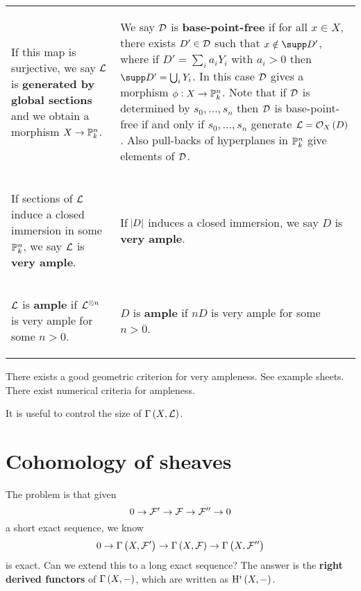 \begin{center}
\begin{tabular}{p{}|p{}}
\begin{center} If this map is surjective, we say $ \mathcal{L} $ is \textbf{generated by global sections} and we obtain a morphism $ X \to \mathbb{P}_k^n $. \end{center} & \begin{center} We say $ \mathcal{D} $ is \textbf{base-point-free} if for all $ x \in X $, there exists $ D' \in \mathcal{D} $ such that $ x \notin \supp D' $, where if $ D' = \sum_i a_iY_i $ with $ a_i > 0 $ then $ \supp D' = \bigcup_i Y_i $. In this case $ \mathcal{D} $ gives a morphism $ \phi : X \to \mathbb{P}_k^n $. Note that if $ \mathcal{D} $ is determined by $ s_0, \dots, s_n $ then $ \mathcal{D} $ is base-point-free if and only if $ s_0, \dots, s_n $ generate $ \LLL = \OOO_X\br{D} $. Also pull-backs of hyperplanes in $ \mathbb{P}_k^n $ give elements of $ \mathcal{D} $. \end{center} \\
\begin{center} If sections of $ \mathcal{L} $ induce a closed immersion in some $ \mathbb{P}_k^n $, we say $ \mathcal{L} $ is \textbf{very ample}. \end{center} & \begin{center} If $ \abs{D} $ induces a closed immersion, we say $ D $ is \textbf{very ample}. \end{center} \\
\begin{center} $ \mathcal{L} $ is \textbf{ample} if $ \mathcal{L}^{\otimes n} $ is very ample for some $ n > 0 $. \end{center} & \begin{center} $ D $ is \textbf{ample} if $ nD $ is very ample for some $ n > 0 $. \end{center}
\end{tabular}
\end{center}

\begin{remark*}
There exists a good geometric criterion for very ampleness. See example sheets. There exist numerical criteria for ampleness.
\end{remark*}

It is useful to control the size of $ \Gamma\br{X, \LLL} $.

\pagebreak

\section{Cohomology of sheaves}

The problem is that given
$$ 0 \to \mathcal{F}' \to \mathcal{F} \to \mathcal{F}'' \to 0 $$
a short exact sequence, we know
$$ 0 \to \Gamma\br{X, \FFF'} \to \Gamma\br{X, \FFF} \to \Gamma\br{X, \FFF''} $$
is exact. Can we extend this to a long exact sequence? The answer is the \textbf{right derived functors} of $ \Gamma\br{X, -} $, which are written as $ \H^i\br{X, -} $.

